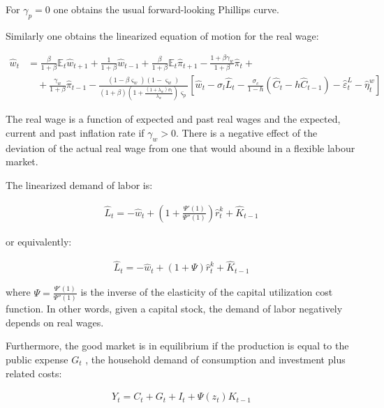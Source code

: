 \documentclass{pracamgr}
\numberwithin{equation}{section}
\begin{document}
For $\gamma_{p} = 0$ one obtains the usual forward-looking Phillips curve.

Similarly one obtains the linearized equation of motion for the real wage:

\begin{align}
\hat{w}_{t} &= \frac{\beta}{1+\beta} \mathbb{E}_{t} \hat{w}_{t+1} + \frac{1}{1+\beta} \hat{w}_{t-1} + \frac{\beta}{1+\beta} \mathbb{E}_{t} \hat{\pi}_{t+1} - \frac{1+ \beta \gamma_{w}}{1+\beta} \hat{\pi}_{t} + \nonumber \\
& \quad + \frac{\gamma_{w}}{1+\beta} \hat{\pi}_{t-1} - \frac{\left( 1 - \beta \varsigma_{w} \right) \left( 1 - \varsigma_{w} \right)}{\left(1+\beta \right) \left( 1 + \frac{\left(1+\lambda_{w}\right)\sigma_{l}}{\lambda_{w}}  \right) \varsigma_{p}} \left[
\hat{w}_{t} - \sigma_{l} \hat{L}_{t} - \frac{\sigma_{c}}{1-h} \left( \hat{C}_{t} - h \hat{C}_{t-1} \right) - \hat{\varepsilon}_{t}^{L} - \hat{\eta}_{t}^{w} \right]
\end{align}

The real wage is a function of expected and past real wages and the expected, current and past inflation rate if $\gamma_{w}>0$. There is a negative effect of the deviation of the actual real wage from one that would abound in a flexible labour market.

The linearized demand of labor is:

\begin{align}
\hat{L}_{t} = - \hat{w}_{t} + \left( 1 + \frac{\Psi'(1)}{\Psi''(1)} \right) \hat{r}^{k}_{t} + \hat{K}_{t-1}
\end{align}

or equivalently:

\begin{align}
\hat{L}_{t} = - \hat{w}_{t} + \left( 1 + \Psi \right) \hat{r}^{k}_{t} + \hat{K}_{t-1}
\end{align}

where $\Psi = \frac{\Psi'(1)}{\Psi''(1)}$ is the inverse of the elasticity of the capital utilization cost function. In other words, given a capital stock, the demand of labor negatively depends on real wages.

Furthermore, the good market is in equilibrium if the production is equal to the public expense $G_{t}$ , the household demand of consumption and investment plus related costs:

\begin{align}
Y_{t} = C_{t} + G_{t} + I_{t} + \Psi(z_{t})K_{t-1}
\end{align}
\end{document}
